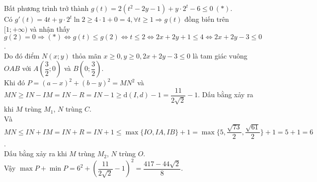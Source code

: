 \begin{ex}
{		Bất phương trình trở thành $g(t)=2(t^2-2y-1)+y\cdot 2^t-6 \leq 0 ~ (*)$.\\
		Có $g'(t)=4t+y\cdot 2^t \ln2 \geq 4\cdot 1+0=4,\forall t \geq 1 \Rightarrow g(t)$ đồng biến trên $[1;+\infty)$ và nhận thấy\\ $g(2)=0 \Rightarrow (*)\Leftrightarrow g(t)\leq g(2)\Leftrightarrow t\leq 2 \Leftrightarrow 2x+2y+1\leq 4 \Leftrightarrow 2x+2y-3 \leq 0$.\\
		Do đó điểm $N(x;y)$ thỏa mãn $x\geq 0,y\geq 0,2x+2y-3\leq 0$ là tam giác vuông $OAB$ với $A\left(\dfrac{3}{2};0\right)$ và $B\left(0;\dfrac{3}{2}\right)$.\\
		Khi đó $P=(a-x)^2+(b-y)^2=MN^2$ và \\
		$MN\geq IN-IM=IN-R=IN-1\geq \mathrm{d}(I,d)-1=\dfrac{11}{2\sqrt{2}}-1$. Dấu bằng xảy ra khi $M$ trùng $M_1$, $N$ trùng $C$.\\
		Và $MN\leq IN+IM =IN+R=IN+1 \leq \max\{IO,IA,IB\}+1=\max \{5,\dfrac{\sqrt{73}}{2},\dfrac{\sqrt{61}}{2} \}+1=5+1=6$.\\
		Dấu bằng xảy ra khi $M$ trùng $M_2$, $N$ trùng $O$.\\
		Vậy $\max P+\min P=6^2+\left(\dfrac{11}{2\sqrt{2}}-1 \right)^2=\dfrac{417-44\sqrt{2}}{8}$.
	}
\end{ex}

